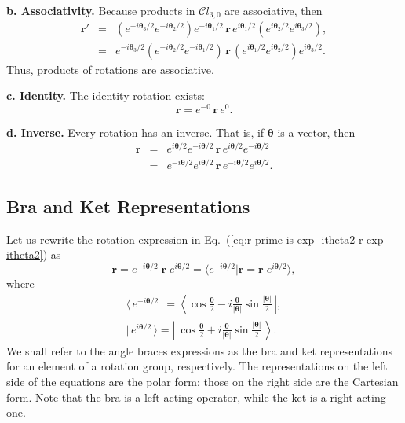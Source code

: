 \documentclass[11pt,twocolumn]{article}
\begin{document}
\textbf{b.  Associativity.} Because products in $\mathcal Cl_{3,0}$ are associative, then 
\begin{eqnarray}
\label{eq:rotations associativity property}
\mathbf r'\!\!&=&\!\!\!\!(e^{-i\bm\theta_3/2}e^{-i\bm\theta_2/2})e^{-i\bm\theta_1/2}\,\mathbf r\,e^{i\bm\theta_1/2}(e^{i\bm\theta_2/2}e^{i\bm\theta_3/2}),\nonumber\\
&=&\!\!\!\!e^{-i\bm\theta_3/2}(e^{-i\bm\theta_2/2}e^{-i\bm\theta_1/2})\,\mathbf r\,(e^{i\bm\theta_1/2}e^{i\bm\theta_2/2})e^{i\bm\theta_3/2}.
\end{eqnarray}
Thus, products of rotations are associative.

\textbf{c.  Identity.}  The identity rotation exists:
\begin{equation}
\label{eq:rotations identity property}
\mathbf r=e^{-0}\,\mathbf r\,e^0.
\end{equation}

\textbf{d.  Inverse.}  Every rotation has an inverse.  That is, if $\bm\theta$ is a vector, then
\begin{eqnarray}
\label{eq:rotations inverse property}
\mathbf r&=&e^{i\bm\theta/2}e^{-i\bm\theta/2}\,\mathbf r\,e^{i\bm\theta/2}e^{-i\bm\theta/2}\nonumber\\
&=&e^{-i\bm\theta/2}e^{i\bm\theta/2}\,\mathbf r\,e^{-i\bm\theta/2}e^{i\bm\theta/2}.
\end{eqnarray}

\subsection{Bra and Ket Representations}

Let us rewrite the rotation expression in Eq.~(\ref{eq:r prime is exp -itheta2 r exp itheta2}) as
\begin{equation}
\label{eq:r prime is exp -itheta2 r exp itheta2 bra ket}
\mathbf r=e^{-i{\bm\theta}/2}\;\mathbf r\;e^{i{\bm\theta}/2}=\langle e^{-i{\bm\theta}/2}|\mathbf r=\mathbf r|e^{i{\bm\theta}/2}\rangle,
\end{equation}
where
\begin{eqnarray}
\label{eq:bra is exp half theta}
\langle\,e^{-i\bm\theta/2}\,|=\left\langle\cos\frac{\bm\theta}{2}-i\frac{\bm\theta}{|\bm\theta|}\sin\frac{|\bm\theta|}{2}\,\right|,\\
\label{eq:ket is exp half theta}
|\,e^{i\bm\theta/2}\,\rangle=\left|\ \cos\frac{\bm\theta}{2}+i\frac{\bm\theta}{|\bm\theta|}\sin\frac{|\bm\theta|}{2}\,\right\rangle.
\end{eqnarray}
We shall refer to the angle braces expressions as the bra and ket representations for an element of a rotation group, respectively.  The representations on the left side of the equations are the polar form; those on the right side are the Cartesian form.  Note that the bra is a left-acting operator, while the ket is a right-acting one.
\end{document}
